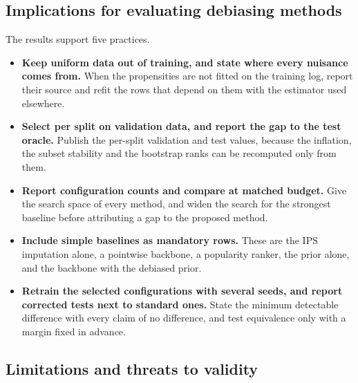 \subsection{Implications for evaluating debiasing methods}\label{sec:disc-implications}

The results support five practices.
\begin{itemize}
\item \textbf{Keep uniform data out of training, and state where every nuisance comes from.} When the propensities are
not fitted on the training log, report their source and refit the rows that depend on them with the estimator used
elsewhere.
\item \textbf{Select per split on validation data, and report the gap to the test oracle.} Publish the per-split
validation and test values, because the inflation, the subset stability and the bootstrap ranks can be recomputed only
from them.
\item \textbf{Report configuration counts and compare at matched budget.} Give the search space of every method, and
widen the search for the strongest baseline before attributing a gap to the proposed method.
\item \textbf{Include simple baselines as mandatory rows.} These are the IPS imputation alone, a pointwise backbone, a
popularity ranker, the prior alone, and the backbone with the debiased prior.
\item \textbf{Retrain the selected configurations with several seeds, and report corrected tests next to standard
ones.} State the minimum detectable difference with every claim of no difference, and test equivalence only with a
margin fixed in advance.
\end{itemize}

\subsection{Limitations and threats to validity}\label{sec:disc-limits}

